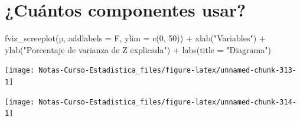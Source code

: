 \documentclass[
  12pt,
]{book}
\newenvironment{Shaded}{\begin{snugshade}}{\end{snugshade}}
\newcommand{\AttributeTok}[1]{\textcolor[rgb]{0.77,0.63,0.00}{#1}}
\newcommand{\DecValTok}[1]{\textcolor[rgb]{0.00,0.00,0.81}{#1}}
\newcommand{\FunctionTok}[1]{\textcolor[rgb]{0.00,0.00,0.00}{#1}}
\newcommand{\NormalTok}[1]{#1}
\newcommand{\SpecialCharTok}[1]{\textcolor[rgb]{0.00,0.00,0.00}{#1}}
\newcommand{\StringTok}[1]{\textcolor[rgb]{0.31,0.60,0.02}{#1}}
\theoremstyle{definition}
\theoremstyle{definition}
\theoremstyle{definition}
\theoremstyle{remark}
\begin{document}
\hypertarget{cuuxe1ntos-componentes-usar}{%
\section{¿Cuántos componentes usar?}\label{cuuxe1ntos-componentes-usar}}

\begin{Shaded}
\begin{Highlighting}[]
\FunctionTok{fviz\_screeplot}\NormalTok{(p, }\AttributeTok{addlabels =}\NormalTok{ F, }\AttributeTok{ylim =} \FunctionTok{c}\NormalTok{(}\DecValTok{0}\NormalTok{, }\DecValTok{50}\NormalTok{)) }\SpecialCharTok{+} 
    \FunctionTok{xlab}\NormalTok{(}\StringTok{"Variables"}\NormalTok{) }\SpecialCharTok{+} \FunctionTok{ylab}\NormalTok{(}\StringTok{"Porcentaje de varianza de Z explicada"}\NormalTok{) }\SpecialCharTok{+} 
    \FunctionTok{labs}\NormalTok{(}\AttributeTok{title =} \StringTok{"Diagrama"}\NormalTok{)}
\end{Highlighting}
\end{Shaded}

\begin{center}\texttt{[image: Notas-Curso-Estadistica\_files/figure-latex/unnamed-chunk-313-1]} \end{center}

\begin{Shaded}
\end{Shaded}

\begin{center}\texttt{[image: Notas-Curso-Estadistica\_files/figure-latex/unnamed-chunk-314-1]} \end{center}
\end{document}
